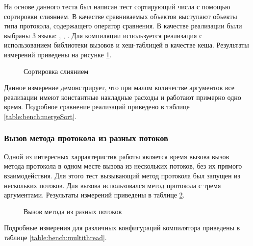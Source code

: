На основе данного теста был написан тест сортирующий числа с помощью сортировки слиянием\cite{merge_sort}. В качестве сравниваемых объектов выступают объекты типа протокола, содержащего оператор сравнения. В качестве реализации были выбраны 3  языка: , , . Для компиляции  используется реализация с использованием библиотеки вызовов и хеш-таблицей в качестве кеша. Результаты измерений приведены на рисунке \ref{plot:bench:mergeSort}.

\begin{figure}
\caption{\label{plot:bench:mergeSort} Сортировка слиянием}
\end{figure}

Данное измерение демонстрирует, что при малом количестве аргументов все реализации имеют константные накладные расходы и работают примерно одно время. Подробное сравнение реализаций приведено в таблице \ref{table:bench:mergeSort}.

\subsubsection{Вызов метода протокола из разных потоков}
Одной из интересных харрактеристик работы является время вызова вызов метода протокола в одном месте вызова из нескольких потоков, без их прямого взаимодействия. Для этого тест вызывающий метод протокола был запущен из нескольких потоков. Для вызова использовался метод протокола с тремя аргументами. Результаты измерений приведены в таблице \ref{plot:bench:multithread}.

\begin{figure}
\caption{\label{plot:bench:multithread} Вызов метода из разных потоков}
\end{figure}

Подробные измерения для различных конфигураций компилятора приведены в таблице \ref{table:bench:multithread}.
